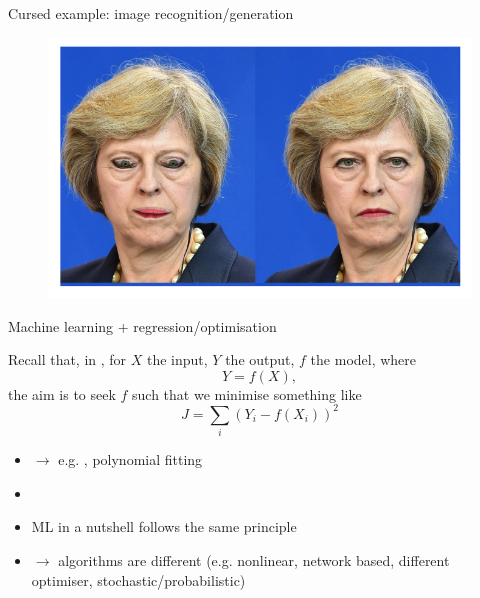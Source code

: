 \documentclass[xcolor=x11names,compress]{beamer}
\renewcommand{\(}{\begin{columns}}
\renewcommand{\)}{\end{columns}}
\newcommand{\<}[1]{\begin{column}{#1}}
\renewcommand{\>}{\end{column}}
\begin{document}

\begin{frame}{Cursed example: image recognition/generation}

\begin{figure}
  \includegraphics[width=\textwidth]{cursed_2}
\end{figure}

\end{frame}


\begin{frame}{Machine learning + regression/optimisation}

Recall that, in , for $X$ the input, $Y$ the output, $f$ the model, where
\begin{equation*}
    Y = f(X),
\end{equation*}
the aim is to seek $f$ such that we minimise something like
\begin{equation*}
    J = \sum_i (Y_i - f(X_i))^2
\end{equation*}
\begin{itemize}
  \item[] $\to$ e.g. , polynomial fitting
  \item[]
  \item ML in a nutshell follows the same principle
  \item[] $\to$ algorithms are different (e.g. nonlinear, network based,
  different optimiser, stochastic/probabilistic)
\end{itemize}

\end{frame}
\end{document}
